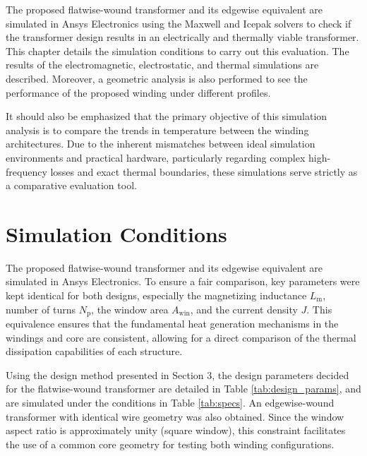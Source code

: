 The proposed flatwise-wound transformer and its edgewise equivalent are simulated in Ansys Electronics using the Maxwell and Icepak solvers to check if the transformer design results in an electrically and thermally viable transformer. This chapter details the simulation conditions to carry out this evaluation. The results of the electromagnetic, electrostatic, and thermal simulations are described. Moreover, a geometric analysis is also performed to see the performance of the proposed winding under different profiles. 

It should also be emphasized that the primary objective of this simulation analysis is to compare the trends in temperature between the winding architectures. Due to the inherent mismatches between ideal simulation environments and practical hardware, particularly regarding complex high-frequency losses and exact thermal boundaries, these simulations serve strictly as a comparative evaluation tool.

\section{Simulation Conditions}
The proposed flatwise-wound transformer and its edgewise equivalent are simulated in Ansys Electronics. To ensure a fair comparison, key parameters were kept identical for both designs, especially the magnetizing inductance $L_{\mathrm{m}}$, number of turns $N_{\mathrm{p}}$, the window area $A_{\mathrm{win}}$, and the current density $J$. This equivalence ensures that the fundamental heat generation mechanisms in the windings and core are consistent, allowing for a direct comparison of the thermal dissipation capabilities of each structure. 

Using the design method presented in Section 3, the design parameters decided for the flatwise-wound transformer are detailed in Table \ref{tab:design_params}, and are simulated under the conditions in Table \ref{tab:specs}. An edgewise-wound transformer with identical wire geometry was also obtained. Since the window aspect ratio is approximately unity (square window), this constraint facilitates the use of a common core geometry for testing both winding configurations. 

